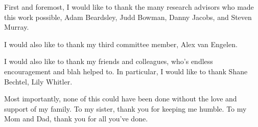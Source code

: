 First and foremost, I would like to thank the many research advisors who made this
work possible, Adam Beardsley, Judd Bowman, Danny Jacobs, and Steven Murray.

I would also like to thank my third committee member, Alex van Engelen.

I would also like to thank my friends and colleagues, who's endless encouragement
and blah helped to. In particular, I would like to thank Shane Bechtel, Lily Whitler.

Most importantly, none of this could have been done without the love and support
of my family. To my sister, thank you for keeping me humble. To my Mom and Dad,
thank you for all you've done.

\clearpage
